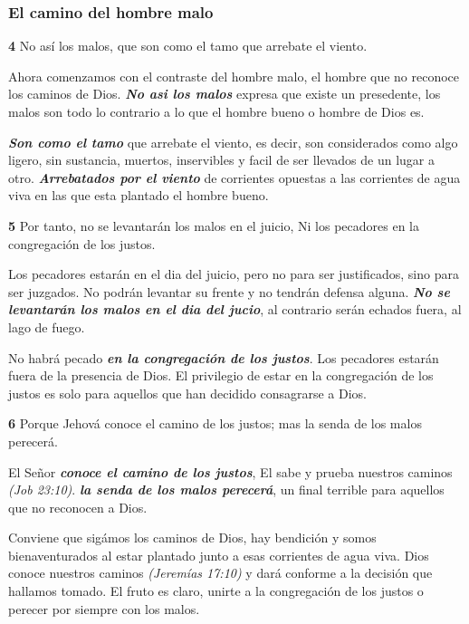 \subsubsection{El camino del hombre malo}

\begin{quotebox}
  \textbf{4} No así los malos, que son como el tamo que arrebate el viento.
\end{quotebox}

Ahora comenzamos con el contraste del hombre malo, el hombre que no
reconoce los caminos de Dios. \textbf{\textit{No asi los malos}}
expresa que existe un presedente, los malos son todo lo contrario a lo
que el hombre bueno o hombre de Dios es.

\textbf{\textit{Son como el tamo}} que arrebate el viento, es decir,
son considerados como algo ligero, sin sustancia, muertos, inservibles
y facil de ser llevados de un lugar a
otro. \textbf{\textit{Arrebatados por el viento}} de corrientes
opuestas a las corrientes de agua viva en las que esta plantado el
hombre bueno.

\begin{quotebox}
  \textbf{5} Por tanto, no se levantarán los malos en el juicio, Ni
  los pecadores en la congregación de los justos.
\end{quotebox}

Los pecadores estarán en el dia del juicio, pero no para ser
justificados, sino para ser juzgados. No podrán levantar su frente y
no tendrán defensa alguna. \textbf{\textit{No se levantarán los malos
en el dia del jucio}}, al contrario serán echados fuera, al lago de
fuego.

No habrá pecado \textbf{\textit{en la congregación de los
justos}}. Los pecadores estarán fuera de la presencia de Dios. El
privilegio de estar en la congregación de los justos es solo para
aquellos que han decidido consagrarse a Dios.

\begin{quotebox}
  \textbf{6} Porque Jehová conoce el camino de los justos; mas la
  senda de los malos perecerá.
\end{quotebox}

El Señor \textbf{\textit{conoce el camino de los justos}}, El sabe y
prueba nuestros caminos \textit{(Job 23:10)}. \textbf{\textit{la senda
de los malos perecerá}}, un final terrible para aquellos que no
reconocen a Dios.

Conviene que sigámos los caminos de Dios, hay bendición y somos
bienaventurados al estar plantado junto a esas corrientes de agua
viva. Dios conoce nuestros caminos \textit{(Jeremías 17:10)} y dará
conforme a la decisión que hallamos tomado. El fruto es claro, unirte a
la congregación de los justos o perecer por siempre con los malos.

